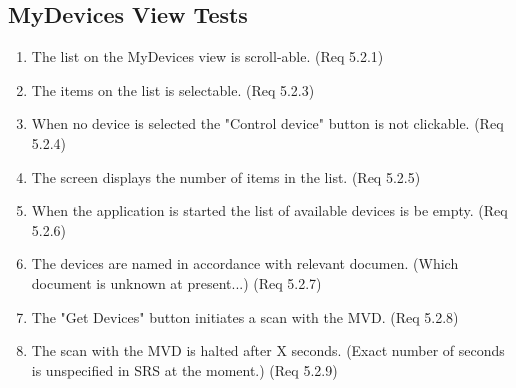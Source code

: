 \documentclass[a4paper]{article}
\begin{document}
\begin{appendices}
\begin{enumerate}[label=\bfseries Test \thesubsection.\arabic*,labelwidth=\widthof{\text{Test 10.10.10}},leftmargin=!]

\end{enumerate}

\subsection{MyDevices View Tests}
\begin{enumerate}[label=\bfseries Test \thesubsection.\arabic*,labelwidth=\widthof{\text{Test 10.10.10}},leftmargin=!]
    \item The list on the MyDevices view is scroll-able. (Req 5.2.1)
    \item The items on the list is selectable. (Req 5.2.3)
    \item When no device is selected the "Control device" button is not clickable. (Req 5.2.4)
    \item The screen displays the number of items in the list. (Req 5.2.5)
    \item When the application is started the list of available devices is be empty. (Req 5.2.6)
    \item The devices are named in accordance with relevant documen. (Which document is unknown at present...) (Req 5.2.7)
    \item The "Get Devices" button initiates a scan with the MVD. (Req 5.2.8)
    \item The scan with the MVD is halted after X seconds. (Exact number of seconds is unspecified in SRS at the moment.) (Req 5.2.9)
\end{enumerate}


\end{appendices}
\end{document}

